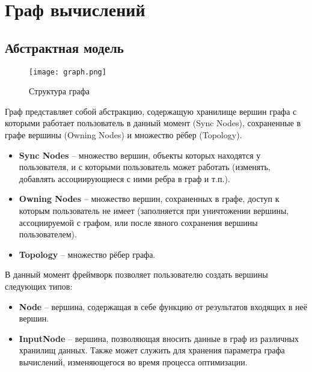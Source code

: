 \clearpage
\section{Граф вычислений}
\subsection{Абстрактная модель}
\label{sec:abstractmodel}
\begin{figure}[ht]
    \centering
    \texttt{[image: graph.png]}
    \caption{Структура графа}
    \label{fig:graphstructure}
\end{figure}
Граф представляет собой абстракцию, содержащую хранилище вершин графа с которыми работает пользователь в данный момент (Sync Nodes), сохраненные в графе вершины (Owning Nodes) и множество рёбер (Topology).
\begin{itemize}
    \item \textbf{Sync Nodes} -- множество вершин, объекты которых находятся у пользователя, и с которыми пользователь может работать (изменять, добавлять ассоциирующиеся с ними ребра в граф и т.п.).
    \item \textbf{Owning Nodes} -- множество вершин, сохраненных в графе, доступ к которым пользователь не имеет (заполняется при уничтожении вершины, ассоциируемой с графом, или после явного сохранения вершины пользователем).
    \item \textbf{Topology} -- множество рёбер графа.
\end{itemize}
В данный момент фреймворк позволяет пользователю создать вершины следующих типов:
\begin{itemize}
	\item \textbf{Node} -- вершина, содержащая в себе функцию от результатов входящих в неё вершин.
	\item \textbf{InputNode} -- вершина, позволяющая вносить данные в граф из различных хранилищ данных. Также может служить для хранения параметра графа вычислений, изменяющегося во время процесса оптимизации. 
\end{itemize}

